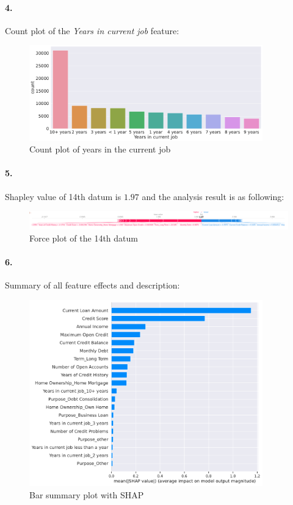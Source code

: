 \documentclass[12pt]{article}
\begin{document}
\paragraph{4.} Count plot of the \textit{Years in current job} feature:

\begin{figure}[h!]
    \centering
    \includegraphics[width=0.9\textwidth]{images/countplot.pdf}
    \caption{Count plot of years in the current job}
    \label{fig:countplot_kaggle}
\end{figure}

\paragraph{5.} Shapley value of 14th datum is $1.97$ and the analysis result is as following:
\begin{figure}[h!]
    \centering
    \includegraphics[width=1.\textwidth]{images/forceplot.png}
    \caption{Force plot of the 14th datum}
    \label{fig:forceplot_kaggle}
\end{figure}


\paragraph{6.} Summary of all feature effects and description:
\begin{figure}[h!]
    \centering
    \includegraphics[width=0.9\textwidth]{images/summary_plot_bar_kaggle.pdf}
    \caption{Bar summary plot with SHAP}
    \label{fig:barplot_kaggle}
\end{figure}
\end{document}
